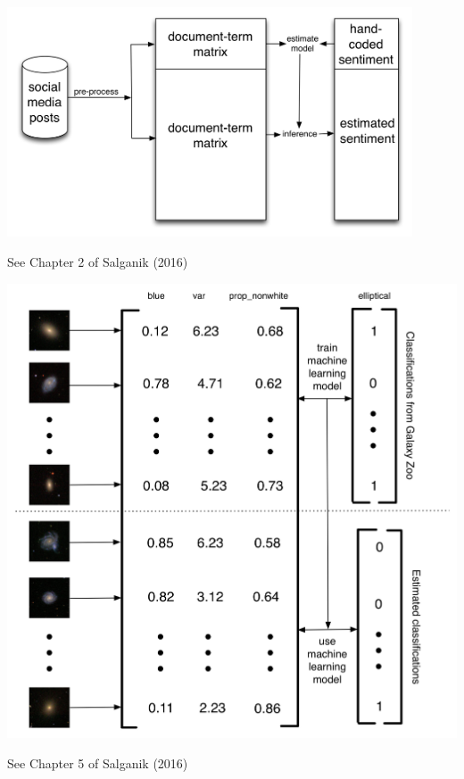 \documentclass[aspectratio=169]{beamer}
\begin{document}
\begin{frame}

\begin{center}
\includegraphics[width=0.9\textwidth]{figures/king_how_2013_schematic}
\end{center}
\vfill
See Chapter 2 of Salganik (2016)
\end{frame}
\begin{frame}

\begin{center}
\includegraphics[height=0.9\textheight]{figures/gz_banerji_schematic}
\end{center}
\vfill
See Chapter 5 of Salganik (2016)
\end{frame}
\end{document}

